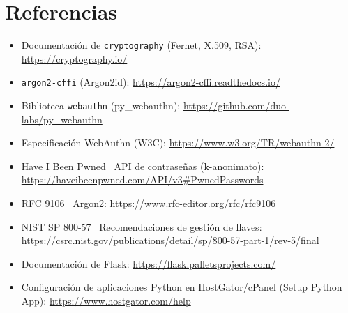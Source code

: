 \documentclass[10pt,letterpaper]{report}
\begin{document}
\chapter{Referencias}
\begin{itemize}
  \item Documentaci\'on de \texttt{cryptography} (Fernet, X.509, RSA): \url{https://cryptography.io/}
  \item \texttt{argon2-cffi} (Argon2id): \url{https://argon2-cffi.readthedocs.io/}
  \item Biblioteca \texttt{webauthn} (py\_webauthn): \url{https://github.com/duo-labs/py_webauthn}
  \item Especificaci\'on WebAuthn (W3C): \url{https://www.w3.org/TR/webauthn-2/}
  \item Have I Been Pwned \textemdash\ API de contrase\~nas (k-anonimato):
  \url{https://haveibeenpwned.com/API/v3#PwnedPasswords}
  \item RFC 9106 \textemdash\ Argon2: \url{https://www.rfc-editor.org/rfc/rfc9106}
  \item NIST SP 800-57 \textemdash\ Recomendaciones de gesti\'on de llaves:
  \url{https://csrc.nist.gov/publications/detail/sp/800-57-part-1/rev-5/final}
  \item Documentaci\'on de Flask: \url{https://flask.palletsprojects.com/}
  \item Configuraci\'on de aplicaciones Python en HostGator/cPanel (Setup Python App):
  \url{https://www.hostgator.com/help}
\end{itemize}
\end{document}
